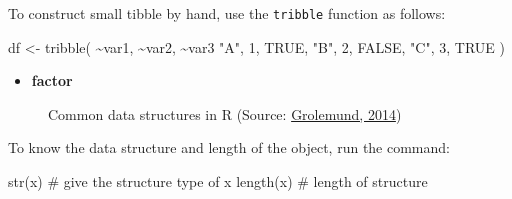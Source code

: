 \documentclass[
  letterpaper,
  DIV=11,
  numbers=noendperiod]{scrreprt}
\newenvironment{Shaded}{\begin{snugshade}}{\end{snugshade}}
\newcommand{\CommentTok}[1]{\textcolor[rgb]{0.37,0.37,0.37}{#1}}
\newcommand{\ConstantTok}[1]{\textcolor[rgb]{0.56,0.35,0.01}{#1}}
\newcommand{\DecValTok}[1]{\textcolor[rgb]{0.68,0.00,0.00}{#1}}
\newcommand{\FunctionTok}[1]{\textcolor[rgb]{0.28,0.35,0.67}{#1}}
\newcommand{\NormalTok}[1]{\textcolor[rgb]{0.00,0.23,0.31}{#1}}
\newcommand{\OtherTok}[1]{\textcolor[rgb]{0.00,0.23,0.31}{#1}}
\newcommand{\SpecialCharTok}[1]{\textcolor[rgb]{0.37,0.37,0.37}{#1}}
\newcommand{\StringTok}[1]{\textcolor[rgb]{0.13,0.47,0.30}{#1}}
\providecommand{\tightlist}{%
  \setlength{\itemsep}{0pt}\setlength{\parskip}{0pt}}\usepackage{longtable,booktabs,array}
\begin{document}
To construct small tibble by hand, use the \texttt{tribble} function as
follows:

\begin{Shaded}
\begin{Highlighting}[]
\NormalTok{df }\OtherTok{\textless{}{-}} \FunctionTok{tribble}\NormalTok{(}
  \SpecialCharTok{\textasciitilde{}}\NormalTok{var1, }\SpecialCharTok{\textasciitilde{}}\NormalTok{var2, }\SpecialCharTok{\textasciitilde{}}\NormalTok{var3}
  \StringTok{"A"}\NormalTok{, }\DecValTok{1}\NormalTok{, }\ConstantTok{TRUE}\NormalTok{,}
  \StringTok{"B"}\NormalTok{, }\DecValTok{2}\NormalTok{, }\ConstantTok{FALSE}\NormalTok{,}
  \StringTok{"C"}\NormalTok{, }\DecValTok{3}\NormalTok{, }\ConstantTok{TRUE}
\NormalTok{)}
\end{Highlighting}
\end{Shaded}

\begin{itemize}
\tightlist
\item
  \textbf{factor}
\end{itemize}

\begin{figure}


\caption{\label{fig-datastructure}Common data structures in R (Source:
\href{https://jjallaire.github.io/hopr/objects.html}{Grolemund, 2014})}

\end{figure}%

To know the data structure and length of the object, run the command:

\begin{Shaded}
\begin{Highlighting}[]
\FunctionTok{str}\NormalTok{(x) }\CommentTok{\# give the structure type of x}
\FunctionTok{length}\NormalTok{(x) }\CommentTok{\# length of structure}
\end{Highlighting}
\end{Shaded}
\end{document}
